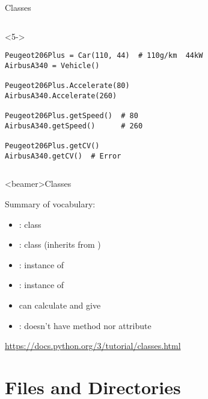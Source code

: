 \begin{frame}[fragile]{Classes}
\begin{columns}[onlytextwidth]
\begin{column}{\textwidth}
      \begin{onlyenv}<5->
        \begin{lstlisting}[style=python]
Peugeot206Plus = Car(110, 44)  # 110g/km  44kW
AirbusA340 = Vehicle()

Peugeot206Plus.Accelerate(80)
AirbusA340.Accelerate(260)

Peugeot206Plus.getSpeed()  # 80
AirbusA340.getSpeed()      # 260

Peugeot206Plus.getCV()
AirbusA340.getCV()  # Error \end{lstlisting}
      \end{onlyenv}

    \end{column}
  \end{columns}

\end{frame}


\begin{frame}<beamer>{Classes}

  Summary of vocabulary:

  \begin{itemize}
    \item<2-> : class
    \item<3-> : class (inherits from )
    \item<4-> : instance of 
    \item<5-> : instance of 
  \end{itemize}

  \begin{itemize}
  \item<6->  can calculate and give 
  \item<7-> : doesn't have  method nor attribute
  \end{itemize}

  \begin{center}
     \url{https://docs.python.org/3/tutorial/classes.html}
  \end{center}

\end{frame}



\section{Files and Directories}

